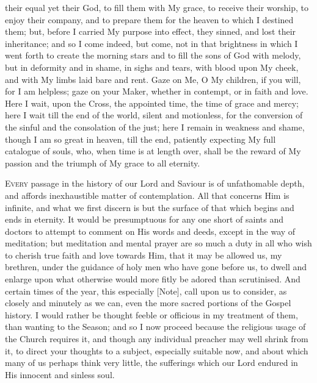 their equal yet their God, to fill them with My grace, to receive
their worship, to enjoy their company, and to prepare them for the
heaven to which I destined them; but, before I carried My purpose into
effect, they sinned, and lost their inheritance; and so I come indeed,
but come, not in that brightness in which I went forth to create the
morning stars and to fill the sons of God with melody, but in
deformity and in shame, in sighs and tears, with blood upon My cheek,
and with My limbs laid bare and rent. Gaze on Me, O My children, if
you will, for I am helpless; gaze on your Maker, whether in contempt,
or in faith and love. Here I wait, upon the Cross, the appointed time,
the time of grace and mercy; here I wait till the end of the world,
silent and motionless, for the conversion of the sinful and the
consolation of the just; here I remain in weakness and shame, though I
am so great in heaven, till the end, patiently expecting My full
catalogue of souls, who, when time is at length over, shall be the
reward of My passion and the triumph of My grace to all eternity.


E\textsc{very} passage in the history of our Lord and Saviour is of
unfathomable depth, and affords inexhaustible matter of contemplation.
All that concerns Him is infinite, and what we first discern is but
the surface of that which begins and ends in eternity. It would be
presumptuous for any one short of saints and doctors to attempt to
comment on His words and deeds, except in the way of meditation; but
meditation and mental prayer are so much a duty in all who wish to
cherish true faith and love towards Him, that it may be allowed us, my
brethren, under the guidance of holy men who have gone before us, to
dwell and enlarge upon what otherwise would more fitly be adored than
scrutinised. And certain times of the year, this especially [Note],
call upon us to consider, as closely and minutely as we can, even the
more sacred portions of the Gospel history. I would rather be thought
feeble or officious in my treatment of them, than wanting to the
Season; and so I now proceed because the religious usage of the Church
requires it, and though any individual preacher may well shrink from
it, to direct your thoughts to a subject, especially suitable now, and
about which many of us perhaps think very little, the sufferings which
our Lord endured in His innocent and sinless soul.

